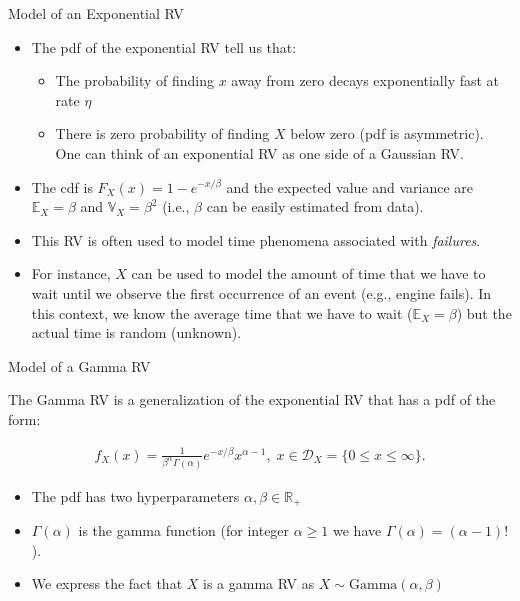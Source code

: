 \documentclass[9pt]{beamer}
\begin{document}
%
\begin{frame}{Model of an Exponential RV}

\begin{itemize}
\item The pdf of the exponential RV tell us that:
\begin{itemize} 
\item The probability of finding $x$ away from zero decays exponentially fast at rate $\eta$
\item There is zero probability of finding $X$ below zero (pdf is asymmetric). One can think of an exponential RV as one side of a Gaussian RV. 
\end{itemize}
\item The cdf is $F_X(x)=1-e^{-x/\beta}$ and the expected value and variance are $\mathbb{E}_X=\beta$ and $\mathbb{V}_X=\beta^2$ (i.e., $\beta$ can be easily estimated from data). 
\item This RV is often used to model time phenomena associated with {\em failures}. 
\item For instance, $X$ can be used to model the amount of time that we have to wait until we observe the first occurrence of an event (e.g., engine fails). In this context, we know the average time that we have to wait ($\mathbb{E}_X=\beta$) but the actual time is random (unknown). 
\end{itemize}

\end{frame}

%
\begin{frame}{Model of a Gamma RV}

The Gamma RV is a generalization of the exponential RV that has a pdf of the form:
\begin{block}{}
\begin{align*}
f_X(x)=\frac{1}{\beta^\alpha \Gamma(\alpha)}e^{-x/\beta}x^{\alpha-1},\; x\in \mathcal{D}_X=\{0\leq x\leq \infty\}.
\end{align*}
\end{block}
\begin{itemize}
\item The pdf has two hyperparameters $\alpha,\beta\in \mathbb{R}_+$
\item $\Gamma(\alpha)$ is the gamma function (for integer $\alpha\geq 1$ we have $\Gamma(\alpha)=(\alpha-1)!$). 
\item We express the fact that $X$ is a gamma RV as $X\sim \textrm{Gamma}(\alpha,\beta)$
\end{itemize}

\end{frame}
\end{document}

